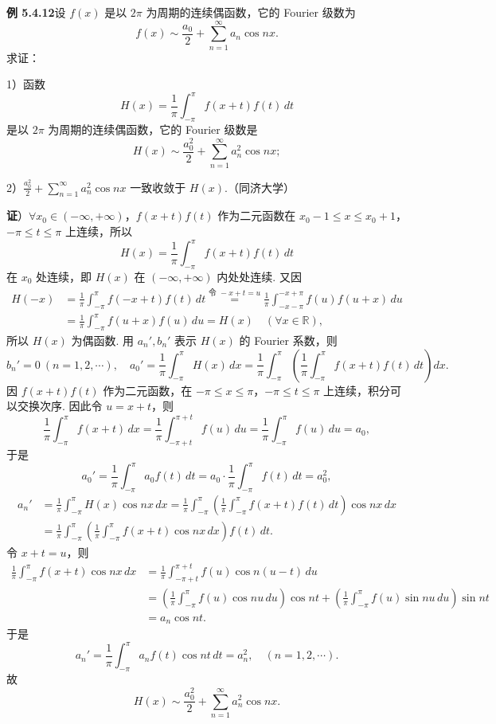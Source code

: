 \documentclass[UTF8, 12pt, fontset=fandol, oneside]{ctexart}
\providecommand{\xlongequal}[1]{\stackrel{#1}{=}}
\begin{document}
\noindent\textbf{例 5.4.12}\quad 设 $f(x)$ 是以 $2\pi$ 为周期的连续偶函数，它的 Fourier 级数为
\[
  f(x)\sim\frac{a_0}{2}+\sum_{n=1}^{\infty}a_n\cos nx.
\]
求证：

1）函数
\[
  H(x)=\frac1\pi\int_{-\pi}^{\pi}f(x+t)f(t)\,dt
\]
是以 $2\pi$ 为周期的连续偶函数，它的 Fourier 级数是
\[
  H(x)\sim\frac{a_0^2}{2}+\sum_{n=1}^{\infty}a_n^2\cos nx;
\]

2）$\displaystyle\frac{a_0^2}{2}+\sum_{n=1}^{\infty}a_n^2\cos nx$ 一致收敛于 $H(x)$.（同济大学）

\noindent\textbf{证}）$\forall x_0\in(-\infty,+\infty)$，$f(x+t)f(t)$ 作为二元函数在
$x_0-1\le x\le x_0+1$，$-\pi\le t\le\pi$ 上连续，所以
\[
  H(x)=\frac1\pi\int_{-\pi}^{\pi}f(x+t)f(t)\,dt
\]
在 $x_0$ 处连续，即 $H(x)$ 在 $(-\infty,+\infty)$ 内处处连续. 又因
\[
\begin{aligned}
H(-x)&=\frac1\pi\int_{-\pi}^{\pi}f(-x+t)f(t)\,dt
\xlongequal{\text{令 }-x+t=u}
\frac1\pi\int_{-x-\pi}^{-x+\pi}f(u)f(u+x)\,du\\
&=\frac1\pi\int_{-\pi}^{\pi}f(u+x)f(u)\,du=H(x)\quad(\forall x\in\mathbb R),
\end{aligned}
\]
所以 $H(x)$ 为偶函数. 用 $a_n',b_n'$ 表示 $H(x)$ 的 Fourier 系数，则
\[
  b_n'=0\ (n=1,2,\cdots),\quad
  a_0'=\frac1\pi\int_{-\pi}^{\pi}H(x)\,dx
  =\frac1\pi\int_{-\pi}^{\pi}\left(\frac1\pi\int_{-\pi}^{\pi}f(x+t)f(t)\,dt\right)dx.
\]
因 $f(x+t)f(t)$ 作为二元函数，在 $-\pi\le x\le\pi$，$-\pi\le t\le\pi$ 上连续，积分可以交换次序. 因此令 $u=x+t$，则
\[
  \frac1\pi\int_{-\pi}^{\pi}f(x+t)\,dx
  =\frac1\pi\int_{-\pi+t}^{\pi+t}f(u)\,du
  =\frac1\pi\int_{-\pi}^{\pi}f(u)\,du=a_0,
\]
于是
\[
  a_0'=\frac1\pi\int_{-\pi}^{\pi}a_0f(t)\,dt
  =a_0\cdot\frac1\pi\int_{-\pi}^{\pi}f(t)\,dt=a_0^2,
\]
\[
\begin{aligned}
a_n'&=\frac1\pi\int_{-\pi}^{\pi}H(x)\cos nx\,dx
=\frac1\pi\int_{-\pi}^{\pi}\left(\frac1\pi\int_{-\pi}^{\pi}f(x+t)f(t)\,dt\right)\cos nx\,dx\\
&=\frac1\pi\int_{-\pi}^{\pi}\left(\frac1\pi\int_{-\pi}^{\pi}f(x+t)\cos nx\,dx\right)f(t)\,dt.
\end{aligned}
\]
令 $x+t=u$，则
\[
\begin{aligned}
\frac1\pi\int_{-\pi}^{\pi}f(x+t)\cos nx\,dx
&=\frac1\pi\int_{-\pi+t}^{\pi+t}f(u)\cos n(u-t)\,du\\
&=\left(\frac1\pi\int_{-\pi}^{\pi}f(u)\cos nu\,du\right)\cos nt
+\left(\frac1\pi\int_{-\pi}^{\pi}f(u)\sin nu\,du\right)\sin nt\\
&=a_n\cos nt.
\end{aligned}
\]
于是
\[
  a_n'=\frac1\pi\int_{-\pi}^{\pi}a_nf(t)\cos nt\,dt=a_n^2,\quad(n=1,2,\cdots).
\]
故
\[
  H(x)\sim\frac{a_0^2}{2}+\sum_{n=1}^{\infty}a_n^2\cos nx.
\]
\end{document}
